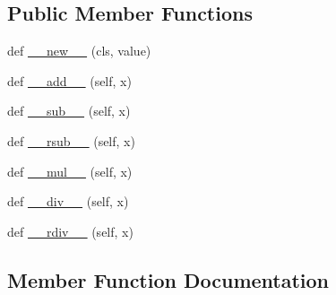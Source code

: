 \subsection*{Public Member Functions}
\begin{DoxyCompactItemize}
\item 
def \hyperlink{classnumpy_1_1core_1_1tests_1_1test__function__base_1_1PhysicalQuantity_a66b06bea293d92c5a763c7724857027c}{\+\_\+\+\_\+new\+\_\+\+\_\+} (cls, value)
\item 
def \hyperlink{classnumpy_1_1core_1_1tests_1_1test__function__base_1_1PhysicalQuantity_a1234ec5ea8aa8a6d2e980495ad227f3b}{\+\_\+\+\_\+add\+\_\+\+\_\+} (self, x)
\item 
def \hyperlink{classnumpy_1_1core_1_1tests_1_1test__function__base_1_1PhysicalQuantity_a27d9ff018c02eecc0d4ec4871eba8fd0}{\+\_\+\+\_\+sub\+\_\+\+\_\+} (self, x)
\item 
def \hyperlink{classnumpy_1_1core_1_1tests_1_1test__function__base_1_1PhysicalQuantity_a25a17e527137635aea1b13939e447d18}{\+\_\+\+\_\+rsub\+\_\+\+\_\+} (self, x)
\item 
def \hyperlink{classnumpy_1_1core_1_1tests_1_1test__function__base_1_1PhysicalQuantity_a2ac3051b3d934ff4c7420a85999752fa}{\+\_\+\+\_\+mul\+\_\+\+\_\+} (self, x)
\item 
def \hyperlink{classnumpy_1_1core_1_1tests_1_1test__function__base_1_1PhysicalQuantity_a27b69212d14ad4c72f02126bfe7ee51a}{\+\_\+\+\_\+div\+\_\+\+\_\+} (self, x)
\item 
def \hyperlink{classnumpy_1_1core_1_1tests_1_1test__function__base_1_1PhysicalQuantity_a0d7b5c7655b3bd3e42f3e6c582122079}{\+\_\+\+\_\+rdiv\+\_\+\+\_\+} (self, x)
\end{DoxyCompactItemize}


\subsection{Member Function Documentation}
\mbox{\label{classnumpy_1_1core_1_1tests_1_1test__function__base_1_1PhysicalQuantity_a1234ec5ea8aa8a6d2e980495ad227f3b}} 
